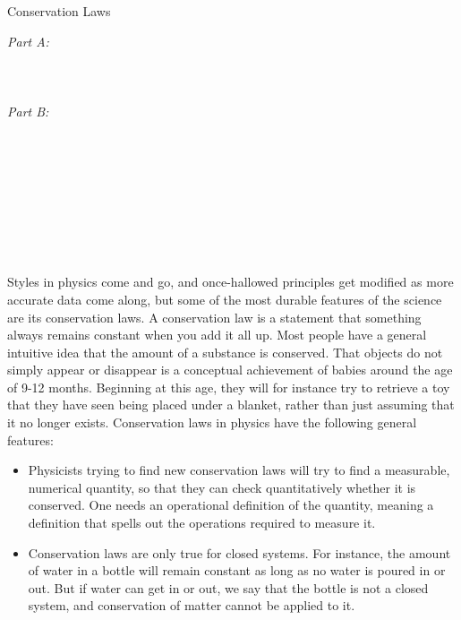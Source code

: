 \begin{lab}{Conservation Laws}

\apparatus
\emph{Part A:}\\
\\
\\
\\
\emph{Part B: }\\
\\
\\
\\
\\
\\
\\
\\
\\


\labintroduction

Styles in physics come and go, and once-hallowed principles
get modified as more accurate data come along, but some of
the most durable features of the science are its conservation
laws.  A conservation law is a statement that something
always remains constant when you add it all up.  Most people
have a general intuitive idea that the amount of a substance
is conserved.  That objects do not simply appear or
disappear is a conceptual achievement of babies around the
age of 9-12 months.  Beginning at this age, they will for
instance try to retrieve a toy that they have seen being
placed under a blanket, rather than just assuming that it no
longer exists. Conservation laws in physics have the
following general features:

\begin{itemize}
\item[] Physicists trying to find new conservation laws will try
to find a measurable, numerical quantity, so that they can
check quantitatively whether it is conserved.  One needs an
operational definition of the quantity, meaning a definition
that spells out the operations required to measure it.

\item[] Conservation laws are only true for closed systems.  For
instance, the amount of water in a bottle will remain
constant as long as no water is poured in or out.  But if
water can get in or out, we say that the bottle is not a
closed system, and conservation of matter cannot be applied to it.


\end{itemize}
\end{lab}
